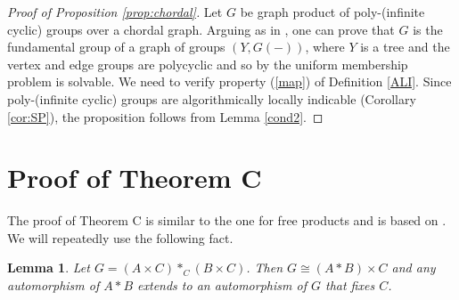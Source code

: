 \documentclass[12pt, a4paper]{amsart}
\newtheorem{Lem}[Thm]{Lemma}
\theoremstyle{remark}
\theoremstyle{definition}
\begin{document}
                                                                                                                                                                                                                                                                                                                                                                                                                                                                                           
\begin{proof}[Proof of Proposition \ref{prop:chordal}] Let $G$ be graph product of poly-(infinite cyclic) groups over a chordal graph. Arguing as in \cite[Corollary 1.3]{Kapovich}, one can prove that $G$ is the fundamental group of a graph of groups $(Y,G(-))$, where $Y$ is a tree and the vertex and edge groups are polycyclic and so by \cite[Theorem 1.1]{Kapovich} the uniform membership problem is solvable. We need to verify property (\ref{map}) of Definition \ref{ALI}. Since poly-(infinite cyclic) groups are algorithmically locally indicable (Corollary \ref{cor:SP}), the proposition follows from Lemma \ref{cond2}. 
\end{proof} 

\section{Proof of Theorem C}\label{sec:ThmC}
The proof of Theorem C is similar to the one for free products and is based on \cite{BBaumslag84, Brodskii84}. We will repeatedly use the following fact.
\begin{Lem}
Let $G=(A\times C)*_C(B\times C)$. Then $G\cong (A*B)\times C$ and any automorphism of $A*B$ extends to an automorphism of $G$ that fixes $C$.
\end{Lem}
\end{document}
